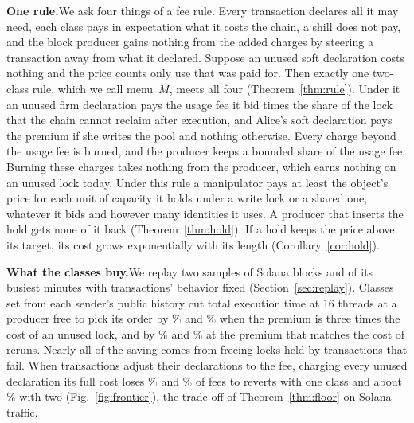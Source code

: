 \documentclass[conference,compsoc]{IEEEtran}
\numberwithin{equation}{section}
\theoremstyle{plain}
\theoremstyle{definition}
\theoremstyle{remark}
\newcommand{\runin}[1]{\par\smallskip\noindent\textbf{#1.}\enspace}
\begin{document}
\runin{One rule}We ask four things of a fee rule. Every transaction declares all it may need, each class pays in expectation what it costs the chain, a shill does not pay, and the block producer gains nothing from the added charges by steering a transaction away from what it declared. Suppose an unused soft declaration costs nothing and the price counts only use that was paid for. Then exactly one two-class rule, which we call menu~$M$, meets all four (Theorem~\ref{thm:rule}). Under it an unused firm declaration pays the usage fee it bid times the share of the lock that the chain cannot reclaim after execution, and Alice's soft declaration pays the premium if she writes the pool and nothing otherwise. Every charge beyond the usage fee is burned, and the producer keeps a bounded share of the usage fee. Burning these charges takes nothing from the producer, which earns nothing on an unused lock today. Under this rule a manipulator pays at least the object's price for each unit of capacity it holds under a write lock or a shared one, whatever it bids and however many identities it uses. A producer that inserts the hold gets none of it back (Theorem~\ref{thm:hold}). If a hold keeps the price above its target, its cost grows exponentially with its length (Corollary~\ref{cor:hold}).

\runin{What the classes buy}We replay two samples of Solana blocks and \nPeak{} of its busiest minutes with transactions' behavior fixed (Section~\ref{sec:replay}). Classes set from each sender's public history cut total execution time at 16 threads at a producer free to pick its order by \freeMenuLoCutSixteenA\% and \freeMenuLoCutSixteenB\% when the premium is three times the cost of an unused lock, and by \freeMenuHiCutSixteenA\% and \freeMenuHiCutSixteenB\% at the premium that matches the cost of reruns. Nearly all of the saving comes from freeing locks held by transactions that fail. When transactions adjust their declarations to the fee, charging every unused declaration its full cost loses \frOneLostRA\% and \frOneLostRB\% of fees to reverts with one class and about \frTwoLostRA\% with two (Fig.~\ref{fig:frontier}), the trade-off of Theorem~\ref{thm:floor} on Solana traffic.
\end{document}
